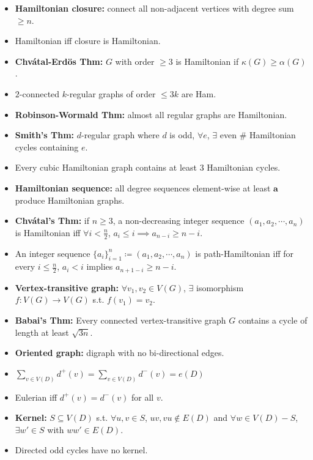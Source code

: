 \documentclass[10pt]{article}
\begin{document}
\begin{multicols*}{3}
\begin{itemize}
            \item \textbf{Hamiltonian closure:} connect all non-adjacent vertices with degree sum $\geq n$.
            \item Hamiltonian iff closure is Hamiltonian.
            \item \textbf{Chv\'{a}tal-Erd\"{o}s Thm:} $G$ with order $\geq 3$ is Hamiltonian if $\kappa(G) \geq \alpha(G)$.
            \item $2$-connected $k$-regular graphs of order $\leq 3k$ are Ham.
            \item \textbf{Robinson-Wormald Thm:} almost all regular graphs are Hamiltonian.
            \item \textbf{Smith's Thm:} $d$-regular graph where $d$ is odd, $\forall e$, $\exists$ even \# Hamiltonian cycles containing $e$.
            \item Every cubic Hamiltonian graph contains at least $3$ Hamiltonian cycles.
            \item \textbf{Hamiltonian sequence:} all degree sequences element-wise at least $\bm{a}$ produce Hamiltonian graphs.
            \item \textbf{Chv\'{a}tal's Thm:} if $n \geq 3$, a non-decreasing integer sequence $(a_1, a_2, \cdots, a_n)$ is Hamiltonian iff $\forall i < \frac{n}{2}$, $a_i \leq i \implies a_{n - i} \geq n - i$.
            \item An integer sequence $\{a_i\}_{i = 1}^n \coloneqq (a_1, a_2, \cdots, a_n)$ is path-Hamiltonian iff for every $i \leq \frac{n}{2}$, $a_i < i$ implies $a_{n + 1 - i} \geq n - i$.
            \item \textbf{Vertex-transitive graph:} $\forall v_1, v_2 \in V(G)$, $\exists$ isomorphism $f \colon V(G) \to V(G)$ s.t. $f(v_1) = v_2$.
            \item \textbf{Babai's Thm:} Every connected vertex-transitive graph $G$ contains a cycle of length at least $\sqrt{3n}$.
            \item \textbf{Oriented graph:} digraph with no bi-directional edges.
            \item $\sum_{v \in V(D)}d^+(v) = \sum_{v \in V(D)}d^-(v) = e(D)$
            \item Eulerian iff $d^+(v) =d^-(v)$ for all $v$.
            \item \textbf{Kernel:} $S \subseteq V(D)$ s.t. $\forall u, v \in S$, $uv, vu \notin E(D)$ and $\forall w \in V(D) - S$, $\exists w' \in S$ with $ww' \in E(D)$.
            \item Directed odd cycles have no kernel.

\end{itemize}
\end{multicols*}
\end{document}
